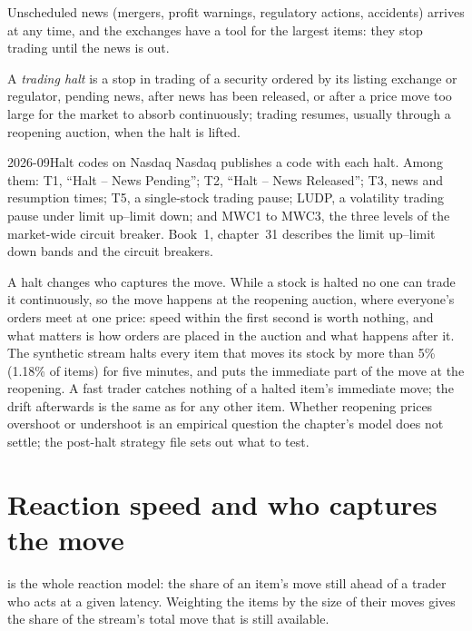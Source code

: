 Unscheduled news (mergers, profit warnings, regulatory actions, accidents) arrives at any time, and the exchanges have a tool for the largest items: they
stop trading until the news is out.

\begin{definition}\label{def:s1:news-and-events:halt}
A \emph{trading halt} is a stop in trading of a security ordered by its listing exchange or regulator, pending news, after news has
been released, or after a price move too large for the market to absorb continuously; trading resumes, usually through a reopening auction, when the
halt is lifted.
\end{definition}

\begin{dated}{2026-09}{Halt codes on Nasdaq}\label{dat:s1:news-and-events:halts}
Nasdaq publishes a code with each halt. Among them: T1, ``Halt -- News Pending''; T2, ``Halt -- News Released''; T3, news and resumption times; T5, a
single-stock trading pause; LUDP, a volatility trading pause under limit up--limit down; and MWC1 to MWC3, the three levels of the market-wide circuit
breaker. Book~1, chapter~31 describes the limit up--limit down bands and the circuit breakers.
\end{dated}

A halt changes who captures the move. While a stock is halted no one can trade it continuously, so the move happens at the reopening auction, where
everyone's orders meet at one price: speed within the first second is worth nothing, and what matters is how orders are placed in the auction and what
happens after it. The synthetic stream halts every item that moves its stock by more than 5\% (1.18\% of items) for five minutes, and puts the immediate
part of the move at the reopening. A fast trader catches nothing of a halted item's immediate move; the drift afterwards is the same as for any other item.
Whether reopening prices overshoot or undershoot is an empirical question the chapter's model does not settle; the post-halt strategy file sets out what
to test.

\section{Reaction speed and who captures the move}

 is the whole reaction model: the share of an item's move still ahead of a trader who acts at a given latency.
Weighting the items by the size of their moves gives the share of the stream's total move that is still available.

